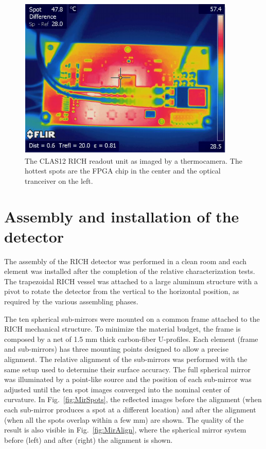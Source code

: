 \documentclass[5p,times,twocolumn]{elsarticle}
\begin{document}
\begin{figure}[t]
\begin{center}
\includegraphics[width=0.70\columnwidth]{FPGA_heat.pdf}
\end{center}
\caption{The CLAS12 RICH readout unit as imaged by a thermocamera. The hottest spots are the FPGA chip in the center and the optical tranceiver on the left.}
\label{Fig:EleTile}
\end{figure}


\section{Assembly and installation of the detector}
The assembly of the RICH detector was performed in a clean room and each element was installed after the completion of the relative characterization tests.
The trapezoidal RICH vessel was attached to a large aluminum structure with a pivot to rotate the detector from the vertical to the horizontal position, as required by the various assembling phases.

The ten spherical sub-mirrors were mounted on a common frame attached to the RICH mechanical structure. 
To minimize the material budget, the frame is composed by a net of 1.5 mm thick carbon-fiber U-profiles. Each element (frame and sub-mirrors) has three mounting points designed to allow a precise alignment. The relative alignment of the sub-mirrors was performed with the same setup used to determine their surface accuracy. The full spherical mirror was illuminated by a point-like source and the position of each sub-mirror was adjusted until the ten spot images converged into the nominal center of curvature. In Fig.~\ref{fig:MirSpots}, the reflected images before the alignment (when each sub-mirror produces a spot at a different location) and after the alignment (when all the spots overlap within a few mm) are shown. The quality of the result is also visible in Fig.~\ref{fig:MirAlign}, where the spherical mirror system before (left) and after (right) the alignment is shown.
\end{document}
